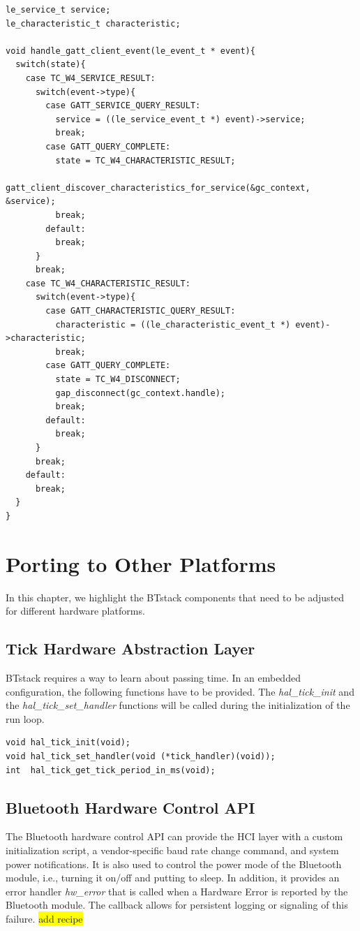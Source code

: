 \documentclass[a4paper,titlepage,oneside,12pt]{amsart} %
\newcommand{\todo}[1]{\colorbox{yellow}{#1}}
\begin{document}
\begin{lstlisting}[caption=GATT client queries handling., label=code:gattBrowserQueryHandler]
le_service_t service;
le_characteristic_t characteristic;
  
void handle_gatt_client_event(le_event_t * event){
  switch(state){
    case TC_W4_SERVICE_RESULT:
      switch(event->type){
        case GATT_SERVICE_QUERY_RESULT:
          service = ((le_service_event_t *) event)->service;
          break;
        case GATT_QUERY_COMPLETE:
          state = TC_W4_CHARACTERISTIC_RESULT;
          gatt_client_discover_characteristics_for_service(&gc_context, &service);
          break;
        default:
          break;
      }
      break;
    case TC_W4_CHARACTERISTIC_RESULT:
      switch(event->type){
        case GATT_CHARACTERISTIC_QUERY_RESULT:
          characteristic = ((le_characteristic_event_t *) event)->characteristic;
          break;
        case GATT_QUERY_COMPLETE:
          state = TC_W4_DISCONNECT;
          gap_disconnect(gc_context.handle);
          break;
        default:
          break;
      }
      break;
    default:
      break;
  }
}
\end{lstlisting}


\section{Porting to Other Platforms}

In this chapter, we highlight the BTstack components that need to be adjusted for different hardware platforms.
\subsection{Tick Hardware Abstraction Layer}
\label{section:tickAbstraction}

BTstack requires a way to learn about passing time. In an embedded configuration, the following functions have to be provided. The \emph{hal\_tick\_init} and the \emph{hal\_tick\_set\_handler} functions will be called during the initialization of the run loop.
 
 \begin{lstlisting}
void hal_tick_init(void);
void hal_tick_set_handler(void (*tick_handler)(void));
int  hal_tick_get_tick_period_in_ms(void);
 \end{lstlisting}
 
\subsection{Bluetooth Hardware Control API}
\label{section:bt_hw_control}
The Bluetooth hardware control API can provide the HCI layer with a custom initialization script, a vendor-specific baud rate change command, and system power notifications. It is also used to control the power mode of the Bluetooth module, i.e., turning it on/off and putting to sleep. In addition, it provides an error handler \emph{hw\_error} that is called when a Hardware Error is reported by the Bluetooth module. The callback allows for persistent logging or signaling of this failure. \todo{add recipe}
\end{document}
